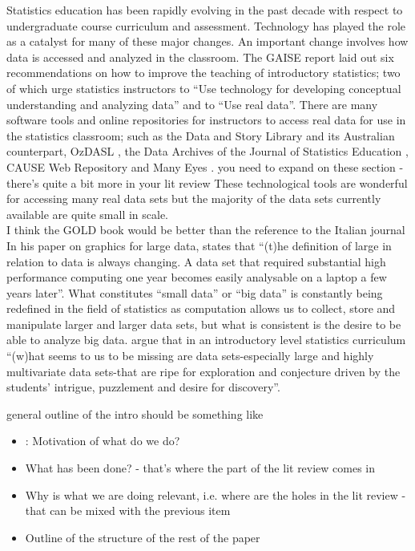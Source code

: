 \documentclass{article}\usepackage[]{graphicx}\usepackage[]{color}
\newcommand{\hh}[1]{{\color{ForestGreen} #1}}
\begin{document}
Statistics education has been rapidly evolving in the past decade with respect to undergraduate course curriculum and assessment. Technology has played the role as a catalyst for many of these major changes.  An important change involves how data is accessed and analyzed in the classroom.   The GAISE report \citep{GAISEcollege} laid out six recommendations on how to improve the teaching of introductory statistics; two of which urge statistics instructors to ``Use technology for developing conceptual understanding and analyzing data'' and to ``Use real data''.   There are many software tools and online repositories for instructors to access real data for use in the statistics classroom; such as the Data and Story Library \citep[DASL, ][]{DASL} and its Australian counterpart, OzDASL \citep{OzDASL}, the Data Archives of the Journal of Statistics Education \citep{JSErepo}, CAUSE Web Repository \citep{CAUSErepo}  and Many Eyes \citep{ManyEyes}. \hh{you need to expand on these section - there's quite a bit more in your lit review}  These technological tools are wonderful for accessing many real data sets but the majority of the data sets currently available are quite small in scale.\\

\hh{I think the GOLD book would be better than the reference to the Italian journal} In his paper on graphics for large data,  \citet[][p.~129]{Unwin1999} states that ``(t)he definition of large in relation to data is always changing. A data set that required substantial high performance computing one year becomes easily analysable on a laptop a few years later''. What constitutes ``small data'' or ``big data'' is constantly being redefined in the field of statistics as computation allows us to collect, store and manipulate larger and larger data sets, but what is consistent is the desire to be able to analyze big data. \citet[][p.~1]{Finzer2007} argue that in an introductory level statistics curriculum ``(w)hat seems to us to be missing are data sets-especially large and highly multivariate data sets-that are ripe for exploration and conjecture driven by the students' intrigue, puzzlement and desire for discovery''.\\

\hh{general outline of the intro should be something like
\begin{itemize}
\item: Motivation of what do we do?
\item What has been done? - that's where the part of the lit review comes in
\item Why is what we are doing relevant, i.e. where are the holes in the lit review - that can be mixed with the previous item
\item Outline of the structure of the rest of the paper
\end{itemize}}
\end{document}
